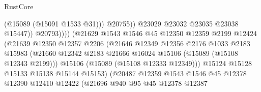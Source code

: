 \begin{lexlean}{RustCore}
\begin{coremodule}
                                                  (@15089 (@15091 @1533 @31)))
                                                @20755))
                                            @23029
                                            @23032
                                            @23035
                                            @23038
                                            @15447))
                                        @20793))))
                                (@21629
                                  @1543
                                  @1546
                                  @45
                                  @12350
                                  @12359
                                  @2199
                                  @12424
                                  (@21639
                                    @12350
                                    @12357
                                    @2206
                                    (@21646
                                      @12349
                                      @12356
                                      @2176
                                      @1033
                                      @2183
                                      @15983
                                      (@21660
                                        @12342
                                        @2183
                                        @21666
                                        @16024
                                        @15106
                                        (@15089 (@15108 @12343 @2199)))
                                      @15106
                                      (@15089 (@15108 @12333 @12349)))
                                    @15124
                                    @15128
                                    @15133
                                    @15138
                                    @15144
                                    @15153)
                                  (@20487
                                    @12359
                                    @1543
                                    @1546
                                    @45
                                    @12378
                                    @12390
                                    @12410
                                    @12422
                                    (@21696
                                      @940
                                      @95
                                      @45
                                      @12378
                                      @12387

\end{coremodule}
\end{lexlean}
